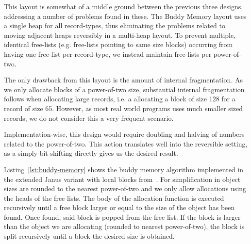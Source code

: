 This layout is somewhat of a middle ground between the previous three designs, addressing a number of problems found in these. The Buddy Memory layout uses a single heap for all record-types, thus eliminating the problems related to moving adjacent heaps reversibly in a multi-heap layout. To prevent multiple, identical free-lists (e.g. free-lists pointing to same size blocks) occurring from having one free-list per record-type, we instead maintain free-lists per power-of-two.

The only drawback from this layout is the amount of internal fragmentation. As we only allocate blocks of a power-of-two size, substantial internal fragmentation follows when allocating large records, i.e. a allocating a block of size 128 for a record of size 65. However, as most real world programs uses much smaller sized records, we do not consider this a very frequent scenario.

Implementation-wise, this design would require doubling and halving of numbers related to the power-of-two. This action translates well into the reversible setting, as a simply bit-shifting directly gives us the desired result.



Listing~\ref{lst:buddy-memory} shows the buddy memory algorithm implemented in the extended Janus variant with local blocks from~\cite{ty:ejanus}. For simplification in object sizes are rounded to the nearest power-of-two and we only allow allocations using the heads of the free lists.
The body of the allocation function is executed recursively until a free block larger or equal to the size of the object has been found. Once found, said block is popped from the free list. If the block is larger than the object we are allocating (rounded to nearest power-of-two), the block is split recursively until a block the desired size is obtained.

